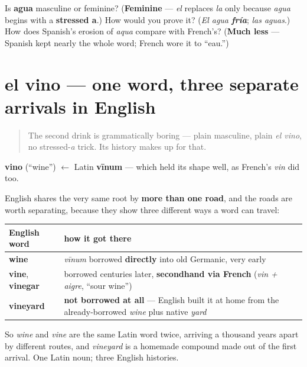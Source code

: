\begin{tcolorbox}[breakable,colback=teal!4,colframe=teal!35!black,title={Before you move on}]
Is \textbf{agua} masculine or feminine? (\textbf{Feminine} — \emph{el} replaces \emph{la} only because \emph{agua} begins with a \textbf{stressed a}.) How would you prove it? (\emph{El agua \textbf{fría}}; \emph{las aguas}.) How does Spanish's erosion of \emph{aqua} compare with French's? (\textbf{Much less} — Spanish kept nearly the whole word; French wore it to \textquotedblleft{}eau.\textquotedblright{})
\end{tcolorbox}
\section[el vino]{el vino — one word, three separate arrivals in English}

\label{lesson:ES-C26-vino}



\begin{quote}
The second drink is grammatically boring — plain masculine, plain \emph{el vino}, no stressed-\emph{a} trick. Its history makes up for that.
\end{quote}

\begin{cousinweb}
\textbf{vino} (\textquotedblleft{}wine\textquotedblright{}) $\leftarrow$ Latin \textbf{vīnum} — which held its shape well, as French's \emph{vin} did too.

English shares the very same root by \textbf{more than one road}, and the roads are worth separating, because they show three different ways a word can travel:

\noindent
\begin{tabularx}{\linewidth}{@{}>{\raggedright\arraybackslash}X>{\raggedright\arraybackslash}X@{}}
\toprule
\textbf{English word} & \textbf{how it got there} \\
\midrule
\textbf{wine} & \emph{vīnum} borrowed \textbf{directly} into old Germanic, very early \\
\textbf{vine}, \textbf{vinegar} & borrowed centuries later, \textbf{secondhand via French} (\emph{vin + aigre}, \textquotedblleft{}sour wine\textquotedblright{}) \\
\textbf{vineyard} & \textbf{not borrowed at all} — English built it at home from the already-borrowed \emph{wine} plus native \emph{yard} \\
\bottomrule
\end{tabularx}

So \emph{wine} and \emph{vine} are the same Latin word twice, arriving a thousand years apart by different routes, and \emph{vineyard} is a homemade compound made out of the first arrival. One Latin noun; three English histories.
\end{cousinweb}

